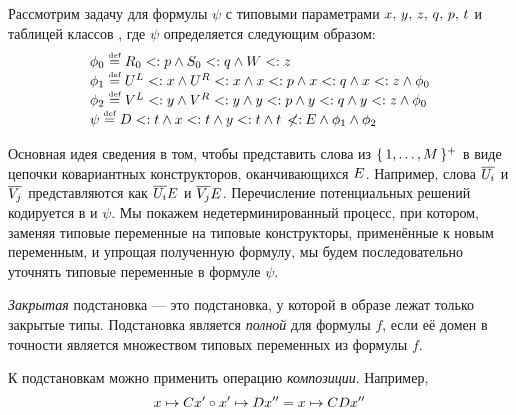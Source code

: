 Рассмотрим задачу \subtypesat{} для формулы $\psi$ с типовыми параметрами $x, \, y, \, z, \, q, \, p, \, t$ и таблицей классов \pcpctid{}, где $\psi$ определяется следующим образом:
\[
    \begin{array}{l}
    \phi_{0} \mathrel{\stackrel{\mbox{\normalfont\tiny def}}{=}} {R}_{0} <: p \land {S}_{0} <: q \land {W} <: z \\
    \phi_{1} \mathrel{\stackrel{\mbox{\normalfont\tiny def}}{=}} {U}^{L} <: x \land {U}^{R} <: x \land x <: p \land x <: q \land x <: z \land \phi_{0} \\
    \phi_{2} \mathrel{\stackrel{\mbox{\normalfont\tiny def}}{=}} {V}^{L} <: y \land {V}^{R} <: y \land y <: p \land y <: q \land y <: z \land \phi_{0} \\
    \psi \mathrel{\stackrel{\mbox{\normalfont\tiny def}}{=}} D <: t \land x <: t \land y <: t \land t \:\not\!\!{<:}\: {E} \land \phi_{1} \land \phi_{2}
    \end{array}
\]

Основная идея сведения в том, чтобы представить слова из $\lbrace \, {1}{},\ldots,{M}{} \, \rbrace^{+}$ в виде цепочки ковариантных конструкторов, оканчивающихся ${E}$. Например, слова $\overline{{U}_{i}}$ и $\overline{{V}_{j}}$ представляются как $\overline{{U}_{i}}{E}$ и $\overline{{V}_{j}}{E}$. Перечисление потенциальных решений \pcp{} кодируется в \pcpctid{} и $\psi$. Мы покажем недетерминированный процесс, при котором, заменяя типовые переменные на типовые конструкторы, применённые к новым переменным, и упрощая полученную формулу, мы будем последовательно уточнять типовые переменные в формуле $\psi$.

\begin{defn}
    \emph{Закрытая} подстановка --- это подстановка, у которой в образе лежат только закрытые типы. Подстановка является \emph{полной} для формулы $f$, если её домен в точности является множеством типовых переменных из формулы $f$.
\end{defn}
К подстановкам можно применить операцию \emph{композиции}. Например,
\[
    x \mapsto Cx' \circ x' \mapsto Dx'' = x \mapsto C{Dx''}
\]

